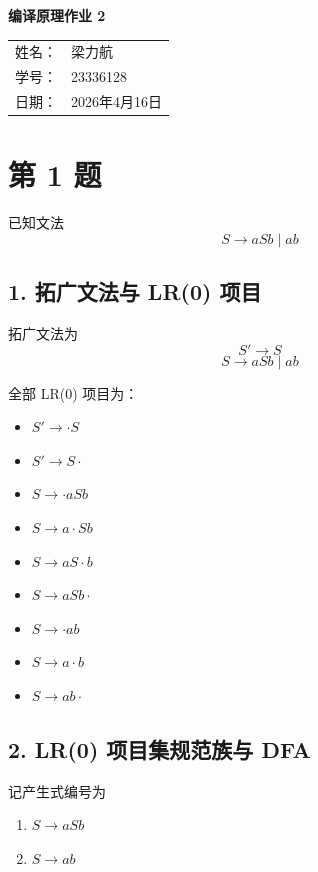 \documentclass[12pt]{article}
\begin{document}
\begin{center}
    {\LARGE\bfseries 编译原理作业 2\par}
    \vspace{1.2cm}
    {\large
    \begin{tabular}{rl}
    姓名：& 梁力航 \\
    学号：& 23336128 \\
    日期：& 2026年4月16日
    \end{tabular}\par}
\end{center}

\vspace{1cm}

\section*{第 1 题}
已知文法
\[
S \rightarrow aSb \mid ab
\]

\subsection*{1. 拓广文法与 LR(0) 项目}
拓广文法为
\[
S' \rightarrow S
\]
\[
S \rightarrow aSb \mid ab
\]

全部 LR(0) 项目为：
\begin{itemize}
    \item $S' \rightarrow \cdot S$
    \item $S' \rightarrow S \cdot$
    \item $S \rightarrow \cdot aSb$
    \item $S \rightarrow a \cdot Sb$
    \item $S \rightarrow aS \cdot b$
    \item $S \rightarrow aSb \cdot$
    \item $S \rightarrow \cdot ab$
    \item $S \rightarrow a \cdot b$
    \item $S \rightarrow ab \cdot$
\end{itemize}

\subsection*{2. LR(0) 项目集规范族与 DFA}
记产生式编号为
\begin{enumerate}
    \item $S \rightarrow aSb$
    \item $S \rightarrow ab$
\end{enumerate}
\end{document}
